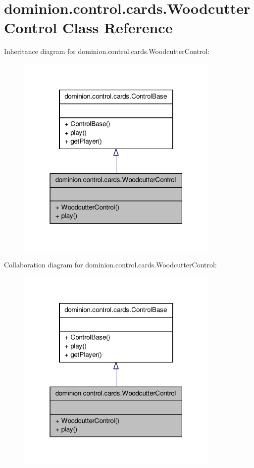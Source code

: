 \hypertarget{classdominion_1_1control_1_1cards_1_1WoodcutterControl}{\section{dominion.\-control.\-cards.\-Woodcutter\-Control \-Class \-Reference}
\label{classdominion_1_1control_1_1cards_1_1WoodcutterControl}
}


\-Inheritance diagram for dominion.\-control.\-cards.\-Woodcutter\-Control\-:
\nopagebreak
\begin{figure}[H]
\begin{center}
\leavevmode
\includegraphics[width=280pt]{classdominion_1_1control_1_1cards_1_1WoodcutterControl__inherit__graph}
\end{center}
\end{figure}


\-Collaboration diagram for dominion.\-control.\-cards.\-Woodcutter\-Control\-:
\nopagebreak
\begin{figure}[H]
\begin{center}
\leavevmode
\includegraphics[width=280pt]{classdominion_1_1control_1_1cards_1_1WoodcutterControl__coll__graph}
\end{center}
\end{figure}
